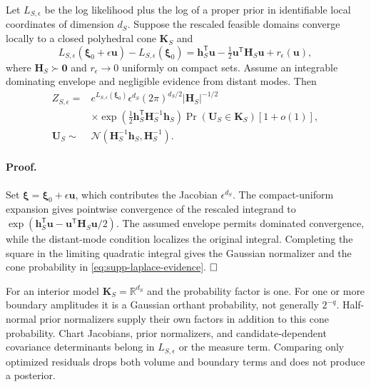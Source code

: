 \begin{theorem}
Let $L_{S,\epsilon}$ be the log likelihood plus the log of a proper prior in
identifiable local coordinates of dimension $d_S$. Suppose the rescaled
feasible domains converge locally to a closed polyhedral cone $\bm K_S$ and
\begin{equation}
 L_{S,\epsilon}(\bm\xi_0+\epsilon\bm u)
 -L_{S,\epsilon}(\bm\xi_0)
 =\bm h_S^{\mathsf T}\bm u
 -\tfrac12\bm u^{\mathsf T}\bm H_S\bm u
 +r_\epsilon(\bm u),
 \label{eq:supp-cone-laplace-expansion}
\end{equation}
where $\bm H_S\succ\bm0$ and $r_\epsilon\to0$ uniformly on compact sets.
Assume an integrable dominating envelope and negligible evidence from distant
modes. Then
\begin{align}
 Z_{S,\epsilon}
 ={}&e^{L_{S,\epsilon}(\bm\xi_0)}\epsilon^{d_S}
 (2\pi)^{d_S/2}|\bm H_S|^{-1/2}
 \nonumber\\
 &\times\exp\!\left(
 \tfrac12\bm h_S^{\mathsf T}\bm H_S^{-1}\bm h_S
 \right)
 \Pr(\bm U_S\in\bm K_S)[1+o(1)],
 \label{eq:supp-laplace-evidence}\\
 \bm U_S\sim{}&
 \mathcal N(\bm H_S^{-1}\bm h_S,\bm H_S^{-1}).
 \nonumber
\end{align}
\label{thm:supp-cone-laplace}
\end{theorem}

\paragraph{Proof.}
Set $\bm\xi=\bm\xi_0+\epsilon\bm u$, which contributes the Jacobian
$\epsilon^{d_S}$. The compact-uniform expansion gives pointwise convergence of
the rescaled integrand to
$\exp(\bm h_S^{\mathsf T}\bm u-\bm u^{\mathsf T}\bm H_S\bm u/2)$.
The assumed envelope permits dominated convergence, while the distant-mode
condition localizes the original integral. Completing the square in the
limiting quadratic integral gives the Gaussian normalizer and the cone
probability in \eqref{eq:supp-laplace-evidence}. $\hfill\square$

For an interior model $\bm K_S=\mathbb R^{d_S}$ and the probability factor is
one. For one or more boundary amplitudes it is a Gaussian orthant probability,
not generally $2^{-q}$. Half-normal prior normalizers supply their own factors
in addition to this cone probability. Chart Jacobians, prior normalizers, and
candidate-dependent covariance determinants belong in $L_{S,\epsilon}$ or the
measure term. Comparing only optimized residuals drops both volume and boundary
terms and does not produce a posterior.

